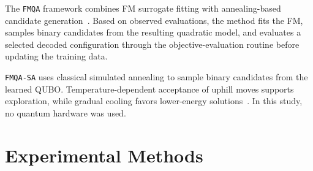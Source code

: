 \documentclass{article}
\begin{document}
The \texttt{FMQA} framework combines FM surrogate fitting with annealing-based candidate generation~\citep{kitai2020designing}.
Based on observed evaluations, the method fits the FM, samples binary candidates from the resulting quadratic model, and evaluates a selected decoded configuration through the objective-evaluation routine before updating the training data.

\texttt{FMQA-SA} uses classical simulated annealing to sample binary candidates from the learned QUBO.
Temperature-dependent acceptance of uphill moves supports exploration, while gradual cooling favors lower-energy solutions~\citep{kirkpatrick1983optimization}.
In this study, no quantum hardware was used.

\section{Experimental Methods}
\label{sec:methodology}\label{sec:cases}
\end{document}
